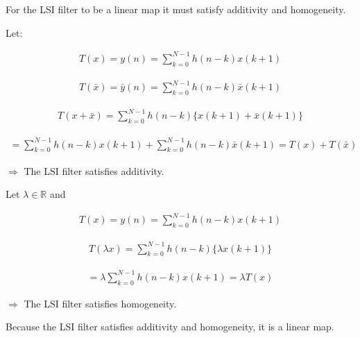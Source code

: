 \documentclass[fleqn]{article}
\begin{document}
\begin{enumerate}[nolistsep]
\begin{enumerate}
			For the LSI filter to be a linear map it must satisfy additivity and homogeneity.
			
			Let:
			
			\begin{align*}
				T(x) = y(n) = \sum_{k=0}^{N-1}{h(n-k)x(k+1)}
			\end{align*}
			
			\begin{align*}
				T(\bar{x}) = \bar{y}(n) = \sum_{k=0}^{N-1}{h(n-k)\bar{x}(k+1)}
			\end{align*}
			
			\begin{align*}
				T(x + \bar{x}) = \sum_{k=0}^{N-1}{h(n-k)\{x(k+1) + \bar{x}(k+1)\}}
			\end{align*}
			
			\begin{align*}
				 = \sum_{k=0}^{N-1}{h(n-k)x(k+1)} + \sum_{k=0}^{N-1}{h(n-k)\bar{x}(k+1)} = T(x) + T(\bar{x})
			\end{align*}
			
			$\Rightarrow$ The LSI filter satisfies additivity.
			
			Let $\lambda \in \mathbb{R}$ and
			
			\begin{align*}
				T(x) = y(n) = \sum_{k=0}^{N-1}{h(n-k)x(k+1)}
			\end{align*}
			
			\begin{align*}
				T(\lambda x) = \sum_{k=0}^{N-1}{h(n-k)\{\lambda x(k+1)\}}
			\end{align*}
			
			\begin{align*}
			= \lambda\sum_{k=0}^{N-1}{h(n-k) x(k+1)} = \lambda T(x)
			\end{align*}
			
			$\Rightarrow$ The LSI filter satisfies homogeneity.
			
			Because the LSI filter satisfies additivity and homogeneity, it is a linear map.
			
		\end{enumerate}
	\end{enumerate}
\end{document}
